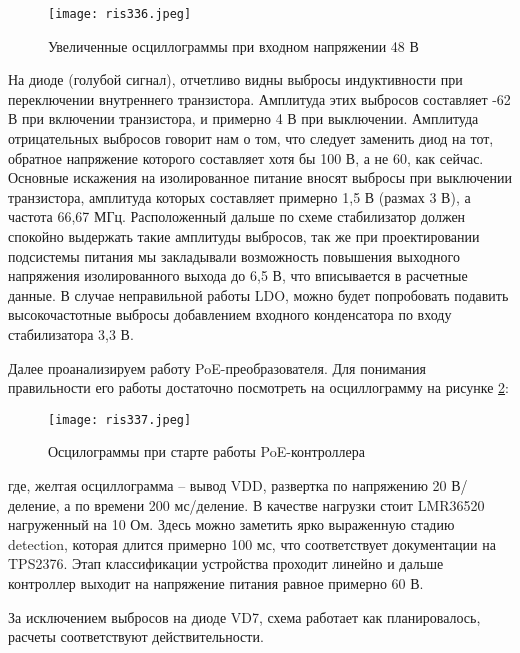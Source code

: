 \begin{figure}[H]
    \centering
    \texttt{[image: ris336.jpeg]}
    \caption{Увеличенные осциллограммы при входном напряжении 48 В}
    \label{ris:336}
\end{figure}

На диоде (голубой сигнал), отчетливо видны выбросы индуктивности при переключении внутреннего транзистора. 
Амплитуда этих выбросов составляет -62 В при включении транзистора, и примерно 4 В при выключении.
Амплитуда отрицательных выбросов говорит нам о том, что следует заменить диод на тот, обратное напряжение которого
составляет хотя бы 100 В, а не 60, как сейчас. Основные искажения на изолированное питание вносят выбросы при 
выключении транзистора, амплитуда которых составляет примерно 1,5 В (размах 3 В), а частота 66,67 МГц. 
Расположенный дальше по схеме стабилизатор должен спокойно выдержать такие амплитуды выбросов, так же при
проектировании подсистемы питания мы закладывали возможность повышения выходного напряжения изолированного 
выхода до 6,5 В, что вписывается в расчетные данные. В случае неправильной работы LDO, можно будет попробовать
подавить высокочастотные выбросы добавлением входного конденсатора по входу стабилизатора 3,3 В.

Далее проанализируем работу PoE-преобразователя. Для понимания правильности его работы достаточно посмотреть
на осциллограмму на рисунке \ref{ris:337}:

\begin{figure}[H]
    \centering
    \texttt{[image: ris337.jpeg]}
    \caption{Осцилограммы при старте работы PoE-контроллера}
    \label{ris:337}
\end{figure}

где, желтая осциллограмма -- вывод VDD, развертка по напряжению 20 В/деление, а по времени 200 мс/деление. 
В качестве нагрузки стоит LMR36520 нагруженный на 10 Ом.
Здесь можно заметить ярко выраженную стадию detection, которая длится 
примерно 100 мс, что соответствует документации на TPS2376. Этап классификации устройства проходит линейно и 
дальше контроллер выходит на напряжение питания равное примерно 60 В. 

За исключением выбросов на диоде VD7, схема работает как планировалось, расчеты соответствуют действительности.

